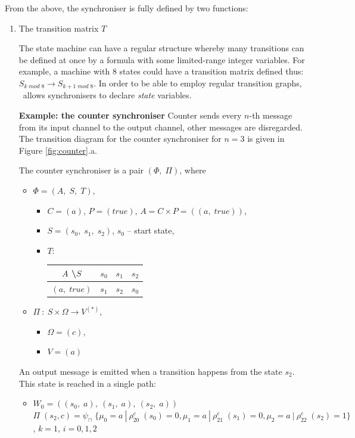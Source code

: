 From the above, the synchroniser is fully defined by two functions:
  \begin{enumerate}
  \item The transition matrix $T$

The state machine can have a regular structure whereby many transitions can be defined at once by a formula with some limited-range integer variables. For example, a machine with 8 states could have a transition matrix defined thus: $S_{k \; mod \; 8} \to S_{k+1 \; mod \; 8}$. In order to be able to employ regular transition graphs, \ak\ allows synchronisers to declare \emph{state} variables.

\textbf{Example: the counter synchroniser}  Counter sends every $n$-th message from its input channel to the output channel, other messages are disregarded. The transition diagram for the counter synchroniser for $n = 3$ is given in Figure \ref{fig:counter}.a.

The counter synchroniser is a pair $(\Phi, \; \Pi)$, where
  \begin{itemize}
  \item[] $\Phi = (A, \; S, \; T)$,
    \begin{itemize}
    \item[] $C = (a)$, $P = (true)$, $A = C \times P = ((a, \; true))$,
    \item[] $S = (s_{0}, \; s_{1}, \; s_{2})$, $s_{0}$ -- start state,
    \item[] $T$:
      \begin{tabular}{c|c|c|c}
      $A$ \textbackslash $S$ & $s_{0}$ & $s_{1}$ & $s_{2}$\\
      \hline
      $(a, \; true)$ & $s_{1}$ & $s_{2}$ & $s_{0}$\\
      \end{tabular}
    \end{itemize}
  \item[] $\Pi \: : \: S \times \Omega \to V^{(*)}$,
    \begin{itemize}
    \item[] $\Omega = (c)$,
    \item[] $V = (a)$
    \end{itemize}
  \end{itemize}

An output message is emitted when a transition happens from the state $s_{2}$. This state is reached in a single path:
  \begin{itemize}
  \item[]
$W_{0} = ((s_{0}, \; a), \: (s_{1}, \; a), \: (s_{2}, \; a))$
$\Pi \; (s_{2}, c) = \psi_{\sqcap} \; \{\mu_{0} = a \: | \: \rho_{20}^{c} \; (s_{0}) = 0, \mu_{1} = a \: | \: \rho_{21}^{c} \; (s_{1}) = 0, \mu_{2} = a \: | \: \rho_{22}^{c} \; (s_{2}) = 1\}$, $k = 1$, $i = 0,1,2$ 
  \end{itemize}


\end{enumerate}
